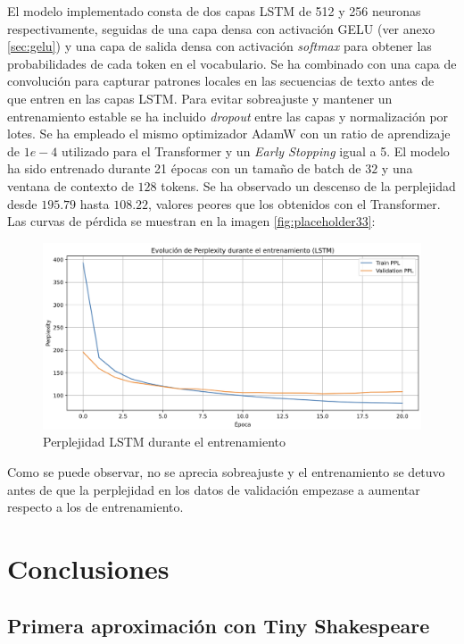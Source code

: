 \documentclass[11pt]{book}
\newcommand{\clearemptydoublepage}{\newpage{\pagestyle{empty}\cleardoublepage}}
\begin{document}
El modelo implementado consta de dos capas LSTM de 512 y 256 neuronas respectivamente, seguidas de una capa densa con activación GELU (ver anexo \ref{sec:gelu}) y una capa de salida densa con activación \textit{softmax} para obtener las probabilidades de cada token en el vocabulario. Se ha combinado con una capa de convolución para capturar patrones locales en las secuencias de texto antes de que entren en las capas LSTM. Para evitar sobreajuste y mantener un entrenamiento estable se ha incluido \textit{dropout} entre las capas y normalización por lotes. Se ha empleado el mismo optimizador AdamW con un ratio de aprendizaje de $1e-4$ utilizado para el Transformer y un \textit{Early Stopping} igual a 5. El modelo ha sido entrenado durante 21 épocas con un tamaño de batch de $32$ y una ventana de contexto de $128$ tokens. Se ha observado un descenso de la perplejidad desde $195.79$ hasta $108.22$, valores peores que los obtenidos con el Transformer. Las curvas de pérdida se muestran en la imagen \ref{fig:placeholder33}:

\begin{figure}[h]
    \centering
    \includegraphics[width=0.5\linewidth]{img/perplexity_lstm.png}
    \caption{Perplejidad LSTM durante el entrenamiento}
    \label{fig:placeholder24}
\end{figure}

Como se puede observar, no se aprecia sobreajuste y el entrenamiento se detuvo antes de que la perplejidad en los datos de validación empezase a aumentar respecto a los de entrenamiento. 


\clearemptydoublepage

\chapter{Conclusiones}

\section{Primera aproximación con Tiny Shakespeare} \label{subsec:fine-tuning}
\end{document}
